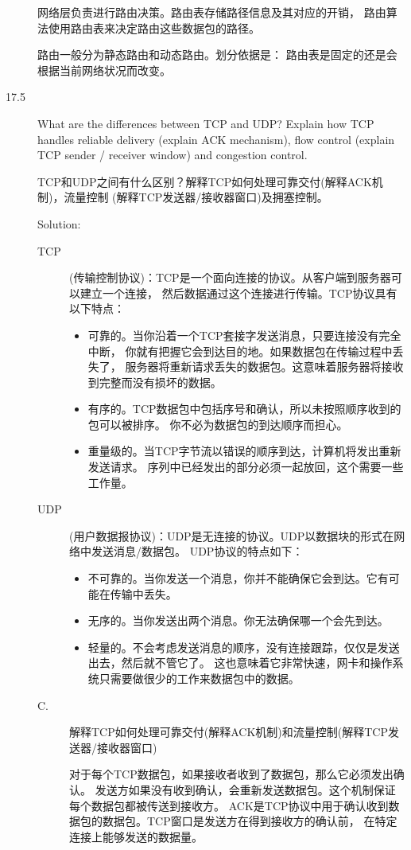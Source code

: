 \begin{description}
  网络层负责进行路由决策。路由表存储路径信息及其对应的开销， 路由算法使用路由表来决定路由这些数据包的路径。

  路由一般分为静态路由和动态路由。划分依据是： 路由表是固定的还是会根据当前网络状况而改变。


\item[17.5] What are the differences between TCP and UDP? Explain how TCP handles reliable delivery (explain ACK mechanism), flow control (explain TCP sender / receiver window) and congestion control.	

  TCP和UDP之间有什么区别？解释TCP如何处理可靠交付(解释ACK机制)，流量控制 (解释TCP发送器/接收器窗口)及拥塞控制。

  Solution:
  \begin{description}
  \item[TCP](传输控制协议)：TCP是一个面向连接的协议。从客户端到服务器可以建立一个连接， 然后数据通过这个连接进行传输。TCP协议具有以下特点：
    \begin{itemize}
    \item 可靠的。当你沿着一个TCP套接字发送消息，只要连接没有完全中断， 你就有把握它会到达目的地。如果数据包在传输过程中丢失了， 服务器将重新请求丢失的数据包。这意味着服务器将接收到完整而没有损坏的数据。
    \item 有序的。TCP数据包中包括序号和确认，所以未按照顺序收到的包可以被排序。 你不必为数据包的到达顺序而担心。
    \item 重量级的。当TCP字节流以错误的顺序到达，计算机将发出重新发送请求。 序列中已经发出的部分必须一起放回，这个需要一些工作量。
    \end{itemize}
  \item[UDP](用户数据报协议)：UDP是无连接的协议。UDP以数据块的形式在网络中发送消息/数据包。 UDP协议的特点如下：
    \begin{itemize}
    \item 不可靠的。当你发送一个消息，你并不能确保它会到达。它有可能在传输中丢失。
    \item 无序的。当你发送出两个消息。你无法确保哪一个会先到达。
    \item 轻量的。不会考虑发送消息的顺序，没有连接跟踪，仅仅是发送出去，然后就不管它了。 这也意味着它非常快速，网卡和操作系统只需要做很少的工作来数据包中的数据。
    \end{itemize}
  \item[C.] 解释TCP如何处理可靠交付(解释ACK机制)和流量控制(解释TCP发送器/接收器窗口)

    对于每个TCP数据包，如果接收者收到了数据包，那么它必须发出确认。 发送方如果没有收到确认，会重新发送数据包。这个机制保证每个数据包都被传送到接收方。 ACK是TCP协议中用于确认收到数据包的数据包。TCP窗口是发送方在得到接收方的确认前， 在特定连接上能够发送的数据量。


\end{description}
\end{description}
